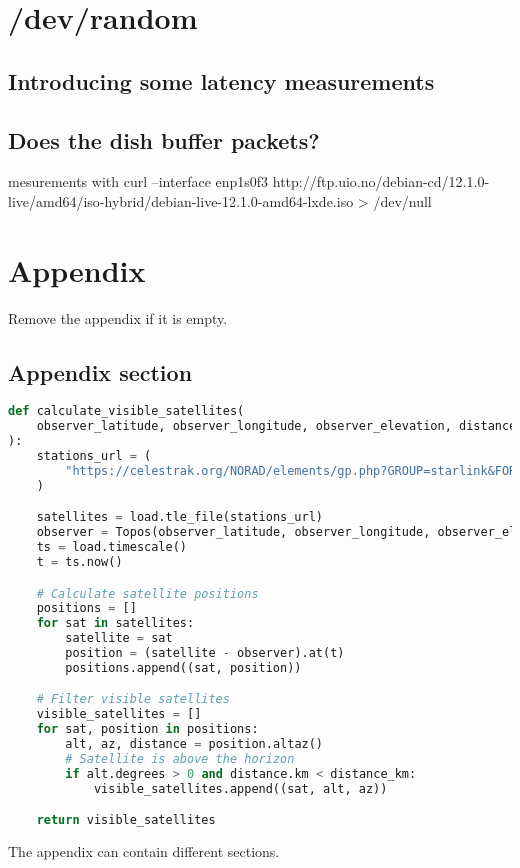 \documentclass[IN,11pt,twoside,openright,bachelor,english]{tumthesis}
\begin{document}
\chapter{/dev/random}

\section{Introducing some latency measurements}
\section{Does the dish buffer packets?}
mesurements with  curl --interface enp1s0f3 http://ftp.uio.no/debian-cd/12.1.0-live/amd64/iso-hybrid/debian-live-12.1.0-amd64-lxde.iso > /dev/null

\appendix
\chapter{Appendix}
\label{chap:appendix}

Remove the appendix if it is empty.

\section{Appendix section}

\begin{lstlisting}[language=python,caption={the \texttt{calculate\_visible\_satellites} function},captionpos=b]
def calculate_visible_satellites(
    observer_latitude, observer_longitude, observer_elevation, distance_km
):
    stations_url = (
        "https://celestrak.org/NORAD/elements/gp.php?GROUP=starlink&FORMAT=tle"
    )

    satellites = load.tle_file(stations_url)
    observer = Topos(observer_latitude, observer_longitude, observer_elevation)
    ts = load.timescale()
    t = ts.now()

    # Calculate satellite positions
    positions = []
    for sat in satellites:
        satellite = sat
        position = (satellite - observer).at(t)
        positions.append((sat, position))

    # Filter visible satellites
    visible_satellites = []
    for sat, position in positions:
        alt, az, distance = position.altaz()
        # Satellite is above the horizon
        if alt.degrees > 0 and distance.km < distance_km:
            visible_satellites.append((sat, alt, az))

    return visible_satellites
\end{lstlisting}

The appendix can contain different sections.

\clearpage
\pagestyle{thesischapter}

\cleardoublepage
{}
\printbibliography[heading=bibintoc]

\clearpage
\pagestyle{empty}
\end{document}
